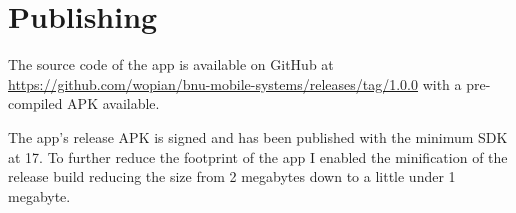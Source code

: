 \chapter{Publishing}

The source code of the app is available on GitHub at \url{https://github.com/wopian/bnu-mobile-systems/releases/tag/1.0.0} with a pre-compiled APK available.

The app's release APK is signed and has been published with the minimum SDK at 17. To further reduce the footprint of the app I enabled the minification of the release build reducing the size from 2 megabytes down to a little under 1 megabyte.
